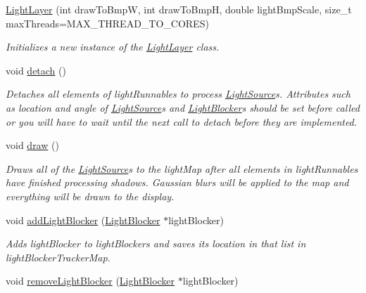 \begin{DoxyCompactItemize}
\item 
\hyperlink{classlighting_1_1LightLayer_a29d0df3bb8c40e2a3ad8e30f4f3c5588}{Light\+Layer} (int draw\+To\+BmpW, int draw\+To\+BmpH, double light\+Bmp\+Scale, size\+\_\+t max\+Threads=M\+A\+X\+\_\+\+T\+H\+R\+E\+A\+D\+\_\+\+T\+O\+\_\+\+C\+O\+R\+ES)
\begin{DoxyCompactList}\small\item\em Initializes a new instance of the \hyperlink{classlighting_1_1LightLayer}{Light\+Layer} class. \end{DoxyCompactList}\item 
void \hyperlink{classlighting_1_1LightLayer_ac4f833f7d7d72586f8efef6967282889}{detach} ()
\begin{DoxyCompactList}\small\item\em Detaches all elements of light\+Runnables to process \hyperlink{classlighting_1_1LightSource}{Light\+Source}s. Attributes such as location and angle of \hyperlink{classlighting_1_1LightSource}{Light\+Source}s and \hyperlink{classlighting_1_1LightBlocker}{Light\+Blocker}s should be set before called or you will have to wait until the next call to detach before they are implemented. \end{DoxyCompactList}\item 
void \hyperlink{classlighting_1_1LightLayer_a6c3ce84a4fd8c6c6e50ac74c91c371fb}{draw} ()
\begin{DoxyCompactList}\small\item\em Draws all of the \hyperlink{classlighting_1_1LightSource}{Light\+Source}s to the light\+Map after all elements in light\+Runnables have finished processing shadows. Gaussian blurs will be applied to the map and everything will be drawn to the display. \end{DoxyCompactList}\item 
void \hyperlink{classlighting_1_1LightLayer_a59dd50384250b760039fff3fd3679db2}{add\+Light\+Blocker} (\hyperlink{classlighting_1_1LightBlocker}{Light\+Blocker} $\ast$light\+Blocker)
\begin{DoxyCompactList}\small\item\em Adds {\itshape light\+Blocker}  to light\+Blockers and saves its location in that list in light\+Blocker\+Tracker\+Map. \end{DoxyCompactList}\item 
void \hyperlink{classlighting_1_1LightLayer_aea3eb133116ff34ba4a4784e637023e4}{remove\+Light\+Blocker} (\hyperlink{classlighting_1_1LightBlocker}{Light\+Blocker} $\ast$light\+Blocker)

\end{DoxyCompactItemize}
